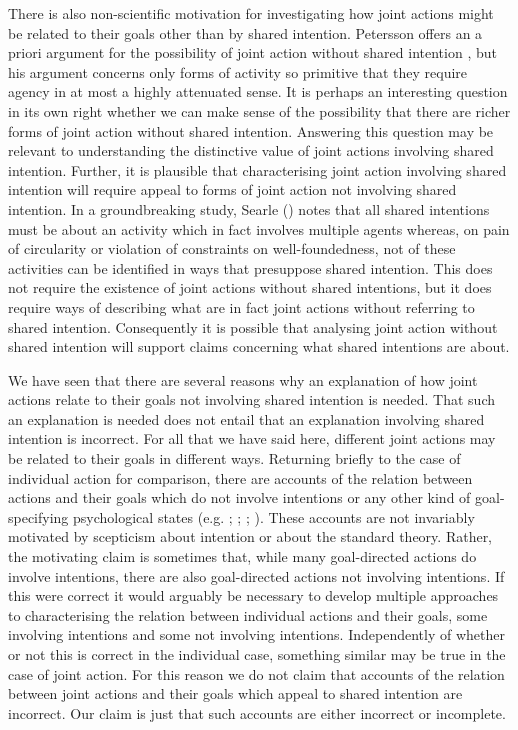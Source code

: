 \documentclass[12pt,a4paper]{extarticle}
\begin{document}
There is also non-scientific motivation for investigating how joint actions might be related to their goals other than by shared intention.  
Petersson offers an a priori argument for the possibility of joint action without shared intention \citep{petersson_collectivity_2007}, but his argument concerns only forms of activity so primitive that they require agency in at most a highly attenuated sense.
It is perhaps an interesting question in its own right whether we can make sense of the possibility that there are richer forms of joint action without shared intention.
Answering this question may be relevant to understanding the distinctive value of joint actions involving shared intention.
Further, it is plausible that characterising joint action involving shared intention will require appeal to forms of joint action not involving shared intention.
In a groundbreaking study, Searle (\citeyear{Searle:1990em}) notes that all shared intentions must be about an activity which in fact involves multiple agents whereas, on pain of circularity or violation of constraints on well-foundedness, not of these activities can be  identified in ways that presuppose shared intention.
This does not require the existence of joint actions without shared intentions, but it does require ways of describing what are in fact joint actions without referring to shared intention.
Consequently it is possible that analysing joint action without shared intention will support claims concerning what shared intentions are about.

We have seen that there are several reasons why an explanation of how joint actions relate to their goals not involving shared intention is needed.  
That such an explanation is needed does not entail that an explanation involving shared intention is incorrect.  For all that we have said here, different joint actions may be related to their goals in different ways.  
Returning briefly to the case of individual action for comparison, there are accounts of the relation between actions and their goals which do not involve intentions or any other kind of goal-specifying psychological states
(e.g.
	\citealp{Bennett:1976rg};
	\citealp{Butterfill:2001kc};
	\citealp{Schueler:2003fk};
	\citealp{Taylor:1964tr}).
These accounts are not invariably motivated by scepticism about intention or about the standard theory.  Rather, the motivating claim is sometimes that, while many goal-directed actions do involve intentions, there are also goal-directed actions not involving intentions.  If this were correct it would arguably be necessary to develop multiple approaches to characterising the relation between individual actions and their goals, some involving intentions and some not involving intentions.  Independently of whether or not this is correct in the individual case, something similar may be true in the case of joint action.  For this reason we do not claim that accounts of the relation between joint actions and their goals which appeal to shared intention are incorrect.  Our claim is just that such accounts are either incorrect or incomplete.
\end{document}
